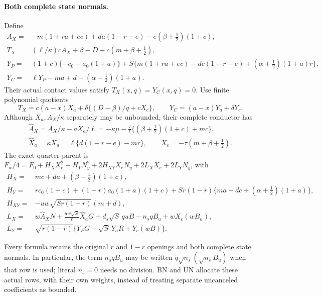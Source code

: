 \paragraph{Both complete state normals.}
Define
\[
\begin{split}
 A_X={}&-m(1+ra+ec)+da(1-r-e)-e(\beta+\tfrac12)(1+c),\\
 T_X={}&(\ell/\kappa)cA_X+\beta-D+c(m+\beta+\tfrac12),\\
 Y_P={}&(1+c)\{-c_0+a_0(1+a)\}
 +S\{m(1+ra+ec)-dc(1-r-e)
                    +(\alpha+\tfrac12)(1+a)r\},\\
 Y_C={}&\ell Y_P-ma+d-(\alpha+\tfrac12)(1+a).
\end{split}\tag{SN15}
\]
Their actual contact values satisfy $T_X(x,q)=Y_C(x,q)=0$.
Use finite polynomial quotients
\[
 T_X=c(a-x)X_a+\delta\{(D-\beta)/q+cX_c\},\qquad
 Y_C=(a-x)Y_a+\delta Y_c.
 \tag{SN16}
\]
Although $X_a,A_X/\kappa$ separately may be unbounded, their
complete conductor has
\[
\begin{gathered}
 \widehat A_X=A_X/\kappa-aX_a/\ell
 =-\kappa\mu-\frac\tau\ell
                  \{(\beta+\tfrac12)(1+c)+mc\},\\
 \widehat X_a=\kappa X_a=\ell\{d(1-r-e)-mr\},\qquad
 X_c=-\tau(m+\beta+\tfrac12).
\end{gathered}\tag{SN17}
\]
The exact quarter-parent is $F_w/4=F_0+H_XX_e^2+H_YN_y^2+
2H_{XY}X_eN_y+2L_XX_e+2L_YN_y$, with
\[
\begin{split}
 H_X={}&mc+da+(\beta+\tfrac12)(1+c),\\
 H_Y={}&rc_0(1+c)+(1-r)a_0(1+a)(1+c)
       +Sr(1-r)\{ma+dc+(\alpha+\tfrac12)(1+a)\},\\
 H_{XY}={}&-uw\sqrt{Sr(1-r)}(m+d),\\
 L_X={}&w\widehat A_XN+
        \frac{uw\sqrt S}{\ell}\widehat X_aG
        +d_s\sqrt S\,quB-n_sqB_u+wX_c(wB_u),\\
 L_Y={}&\sqrt{r(1-r)}\{Y_PG+\sqrt S\,Y_aR+Y_c(wB)\}.
\end{split}\tag{SN18}
\]

Every formula retains the original $r$ and $1-r$ openings and both
complete state normals.  In particular, the term $n_sqB_u$ may be
written $q\sqrt{n_s}(\sqrt{n_s}B_u)$ when that row is used;
literal $n_s=0$ needs no division.  BN and UN allocate these actual
rows, with their own weights, instead of treating separate uncanceled
coefficients as bounded.

